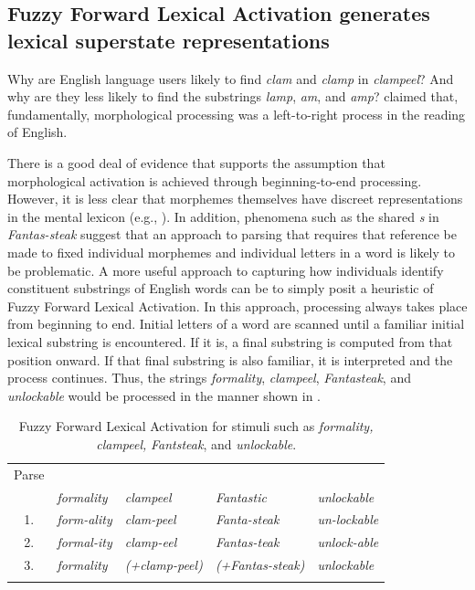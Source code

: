 \documentclass[output=paper]{langsci/langscibook}
\begin{document}
\subsection{Fuzzy Forward Lexical Activation generates lexical superstate representations}\label{sec:libben:1.4}

Why are English language users likely to find \textit{clam} and \textit{clamp} in \textit{clampeel}? And why are they less likely to find the substrings \textit{lamp}, \textit{am}, and \textit{amp}? \citet{TaftForster1976} claimed that, fundamentally, morphological processing was a left-to-right process in the reading of English.  

There is a good deal of evidence that supports the assumption that morphological activation is achieved through beginning-to-end processing. However, it is less clear that morphemes themselves have discreet representations in the mental lexicon (e.g., \citealt{BaayenSmolka2019,RamscarEtAl2018}).  In addition, phenomena such as the shared \textit{s} in \textit{Fantas-steak} suggest that an approach to parsing that requires that reference be made to fixed individual morphemes and individual letters in a word is likely to be problematic.  A more useful approach to capturing how individuals identify constituent substrings of English words can be to simply posit a heuristic of Fuzzy Forward Lexical Activation. In this approach, processing always takes place from beginning to end. Initial letters of a word are scanned until a familiar initial lexical substring is encountered. If it is, a final substring is computed from that position onward. If that final substring is also familiar, it is interpreted and the process continues.  Thus, the strings \textit{formality}, \textit{clampeel}, \textit{Fantasteak}, and \textit{unlockable} would be processed in the manner shown in .

\begin{table}
\caption{\label{tab:libben:1}Fuzzy Forward Lexical Activation for stimuli such as \textit{formality,} \textit{clampeel,} \textit{Fantsteak}, and \textit{unlockable}.}
\begin{tabular}{c*{4}{>{\itshape}l}}
\lsptoprule

{Parse}  & \multicolumn{4}{c}{{Stimuli}}\\\cmidrule(lr){2-5}
& \textit{formality} & \textit{clampeel} & \textit{Fantastic} & \textit{unlockable}\\\midrule
 1. & form-ality & clam-peel & Fanta-steak & un-lockable\\
 2. & formal-ity & clamp-eel & Fantas-teak & unlock-able\\
 3. & formality & (+clamp-peel) & (+Fantas-steak) & unlockable\\
\lspbottomrule
\end{tabular}
\end{table}
\end{document}
